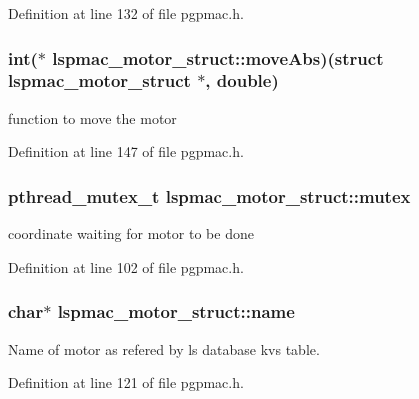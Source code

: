 Definition at line 132 of file pgpmac.\-h.

\hypertarget{structlspmac__motor__struct_a38b6eee046c3ceff84f908af3335ebcf}{
\subsubsection[{move\-Abs}]{\setlength{\rightskip}{0pt plus 5cm}int($\ast$ lspmac\-\_\-motor\-\_\-struct\-::move\-Abs)(struct {\bf lspmac\-\_\-motor\-\_\-struct} $\ast$, double)}}\label{structlspmac__motor__struct_a38b6eee046c3ceff84f908af3335ebcf}


function to move the motor 



Definition at line 147 of file pgpmac.\-h.

\hypertarget{structlspmac__motor__struct_a188c5b1e991750ce2ffd53e0192e0907}{
\subsubsection[{mutex}]{\setlength{\rightskip}{0pt plus 5cm}pthread\-\_\-mutex\-\_\-t lspmac\-\_\-motor\-\_\-struct\-::mutex}}\label{structlspmac__motor__struct_a188c5b1e991750ce2ffd53e0192e0907}


coordinate waiting for motor to be done 



Definition at line 102 of file pgpmac.\-h.

\hypertarget{structlspmac__motor__struct_aa90af2f6f1489f1befe1d0891e51575a}{
\subsubsection[{name}]{\setlength{\rightskip}{0pt plus 5cm}char$\ast$ lspmac\-\_\-motor\-\_\-struct\-::name}}\label{structlspmac__motor__struct_aa90af2f6f1489f1befe1d0891e51575a}


Name of motor as refered by ls database kvs table. 



Definition at line 121 of file pgpmac.\-h.

